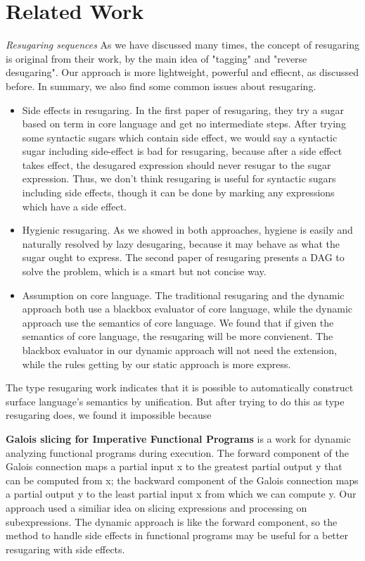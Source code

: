 \section{Related Work}
\label{sec5}

\emph{Resugaring sequences }\cite{resugaring,hygienic} As we have discussed many times, the concept of resugaring is original from their work, by the main idea of "tagging" and "reverse desugaring". Our approach is more lightweight, powerful and effiecnt, as discussed before. In summary, we also find some common issues about resugaring.
\begin{itemize}
\item Side effects in resugaring. In the first paper of resugaring, they try a  sugar based on  term in core language and get no intermediate steps. After trying some syntactic sugars which contain side effect, we would say a syntactic sugar including side-effect is bad for resugaring, because after a side effect takes effect, the desugared expression should never resugar to the sugar expression. Thus, we don't think resugaring is useful for syntactic sugars  including side effects, though it can be done by marking any expressions which have a side effect.
\item Hygienic resugaring. As we showed in both approaches, hygiene is easily and naturally resolved by lazy desugaring, because it may behave as what the sugar ought to express. The second paper of resugaring presents a DAG to solve the problem, which is a smart but not concise way.
\item Assumption on core language. The traditional resugaring and the dynamic approach both use a blackbox evaluator of core language, while the dynamic approach use the semantics of core language. We found that if given the semantics of core language, the resugaring will be more convienent. The blackbox evaluator in our dynamic approach will not need the extension, while the rules getting by our static approach is more express. 
\end{itemize}

The type resugaring work\cite{resugaringtype} indicates that it is possible to automatically construct surface language's semantics by unification. But after trying to do this as type resugaring does, we found it impossible because 


{\bfseries Galois slicing for Imperative Functional Programs\cite{slicing}} is a work for dynamic analyzing functional programs during execution. The forward component of the Galois connection maps a partial input x to the greatest partial output y that can be computed from x; the backward component of the Galois connection maps a partial output y to the least partial input x from which we can compute y. Our approach used a similiar idea on slicing expressions and processing on subexpressions. The dynamic approach is like the forward component, so the method to handle side effects in functional programs may be useful for a better resugaring with side effects.

